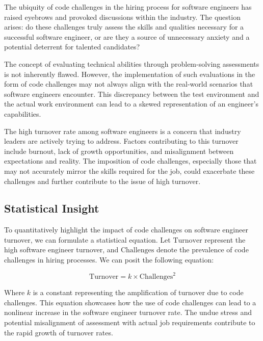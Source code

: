 \documentclass[
    a4paper, %
    10pt, %
    unnumberedsections, %
    twoside, %
]{LTJournalArticle}
\begin{document}
The ubiquity of code challenges in the hiring process for software engineers has raised eyebrows and provoked discussions within the industry. The question arises: do these challenges truly assess the skills and qualities necessary for a successful software engineer, or are they a source of unnecessary anxiety and a potential deterrent for talented candidates?

The concept of evaluating technical abilities through problem-solving assessments is not inherently flawed. However, the implementation of such evaluations in the form of code challenges may not always align with the real-world scenarios that software engineers encounter. This discrepancy between the test environment and the actual work environment can lead to a skewed representation of an engineer's capabilities.

The high turnover rate among software engineers is a concern that industry leaders are actively trying to address. Factors contributing to this turnover include burnout, lack of growth opportunities, and misalignment between expectations and reality. The imposition of code challenges, especially those that may not accurately mirror the skills required for the job, could exacerbate these challenges and further contribute to the issue of high turnover.

\subsection{Statistical Insight}

To quantitatively highlight the impact of code challenges on software engineer turnover, we can formulate a statistical equation. Let $\text{Turnover}$ represent the high software engineer turnover, and $\text{Challenges}$ denote the prevalence of code challenges in hiring processes. We can posit the following equation:

\begin{equation}
    \text{Turnover} = k \times \text{Challenges}^2
\end{equation}


Where $k$ is a constant representing the amplification of turnover due to code challenges. This equation showcases how the use of code challenges can lead to a nonlinear increase in the software engineer turnover rate. The undue stress and potential misalignment of assessment with actual job requirements contribute to the rapid growth of turnover rates.
\end{document}
